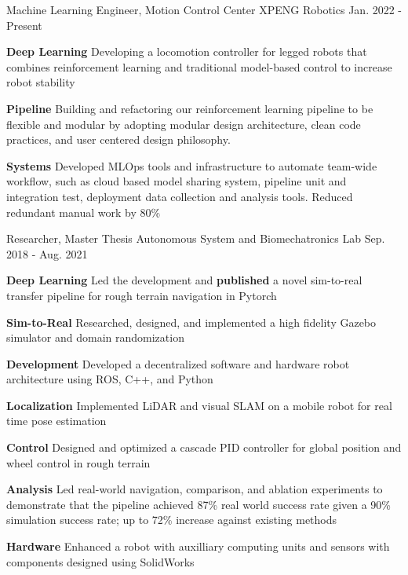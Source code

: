 \begin{cventries}
	\cventry
	{Machine Learning Engineer, Motion Control Center}
	{XPENG Robotics}
	{Jan. 2022 - Present}
	{}
	{
		\begin{cvitems}
			\item {
				\textbf{Deep Learning} Developing a locomotion controller for legged robots that combines reinforcement learning and traditional model-based control to increase robot stability
			}
			\item {
				\textbf{Pipeline} Building and refactoring our reinforcement learning pipeline to be flexible and modular by adopting modular design architecture, clean code practices, and user centered design philosophy.
			}
			\item {
				\textbf{Systems} Developed MLOps tools and infrastructure to automate team-wide workflow, such as cloud based model sharing system, pipeline unit and integration test, deployment data collection and analysis tools. Reduced redundant manual work by 80\%
			}
		\end{cvitems}
	}
	\cventry
	{Researcher, Master Thesis}
	{Autonomous System and Biomechatronics Lab}
	{Sep. 2018 - Aug. 2021}
	{}
	{
		\begin{cvitems}
			\item {
				\textbf{Deep Learning} Led the development and \textbf{published} a novel sim-to-real transfer pipeline for rough terrain navigation in Pytorch
			}
			\item {
				\textbf{Sim-to-Real} Researched, designed, and implemented a high fidelity Gazebo simulator and domain randomization
			}
			\item {
				\textbf{Development} Developed a decentralized software and hardware robot architecture using ROS, C++, and Python
			}
			\item {
				\textbf{Localization} Implemented LiDAR and visual SLAM on a mobile robot for real time pose estimation
			}
			\item {
				\textbf{Control} Designed and optimized a cascade PID controller for global position and wheel control in rough terrain
			}
			\item {
				\textbf{Analysis} Led real-world navigation, comparison, and ablation experiments to demonstrate that the pipeline achieved 87\% real world success rate given a 90\% simulation success rate; up to 72\% increase against existing methods
			}
			\item {
				\textbf{Hardware} Enhanced a robot with auxilliary computing units and sensors with components designed using SolidWorks
}
\end{cvitems}}
\end{cventries}

